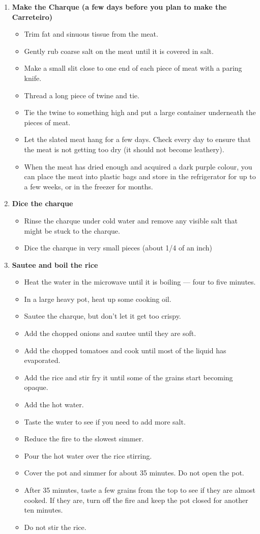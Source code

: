 \documentclass[11pt,letterpaper]{article}
\begin{document}
\begin{description}
	\begin{enumerate}
	\item {\bf Make the Charque (a few days before you plan to make the Carreteiro)}
	\begin{itemize}
	\item Trim fat and sinuous tissue from the meat.
	\item Gently rub coarse salt on the meat until it is covered in salt.
	\item Make a small slit close to one end of each piece of meat with a paring knife.
	\item Thread a long piece of twine and tie.
	\item Tie the twine to something high and put a large container underneath the pieces of meat.
	\item Let the slated meat hang for a few days. Check every day to ensure that the meat is not getting too dry (it should not become leathery).
	\item When the meat has dried enough and acquired a dark purple colour, you can place the meat into plastic bags and store in the refrigerator for up to a few weeks, or in the freezer for months.
	\end{itemize}
	\item {\bf Dice the charque}
	\begin{itemize}
	\item Rinse the charque under cold water and remove any visible salt that might be stuck to the charque.
	\item Dice the charque in very small pieces (about 1/4 of an inch)
	\end{itemize}
	\item {\bf Sautee and boil the rice}
	\begin{itemize}
	\item Heat the water in the microwave until it is boiling --- four to five minutes.
	\item In a large heavy pot, heat up some cooking oil.
	\item Sautee the charque, but don't let it get too crispy.
	\item Add the chopped onions and sautee until they are soft.
	\item Add the chopped tomatoes and cook until most of the liquid has evaporated.
	\item Add the rice and stir fry it until some of the grains start becoming opaque.
	\item Add the hot water.
	\item Taste the water to see if you need to add more salt.
	\item Reduce the fire to the slowest simmer.
	\item Pour the hot water over the rice stirring.
	\item Cover the pot and simmer for about 35 minutes. Do not open the pot.
	\item After 35 minutes, taste a few grains from the top to see if they are almost cooked. If they are, turn off the fire and keep the pot closed for another ten minutes.
	\item Do not stir the rice.
	\end{itemize}
	

\end{enumerate}
\end{description}
\end{document}
